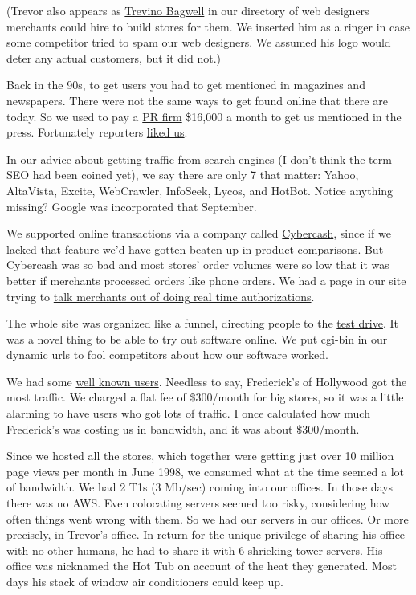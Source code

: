 \documentclass[12pt]{book}
\begin{document}
(Trevor also appears as
\href{http://ycombinator.com/viaweb/tlbwebdesign.html}{Trevino Bagwell}
in our directory of web designers merchants could hire to build stores
for them. We inserted him as a ringer in case some competitor tried to
spam our web designers. We assumed his logo would deter any actual
customers, but it did not.)

Back in the 90s, to get users you had to get mentioned in magazines and
newspapers. There were not the same ways to get found online that there
are today. So we used to pay a \href{submarine.html}{PR firm} \$16,000 a
month to get us mentioned in the press. Fortunately reporters
\href{http://ycombinator.com/viaweb/presquot.html}{liked us}.

In our \href{http://ycombinator.com/viaweb/se.html}{advice about getting
traffic from search engines} (I don't think the term SEO had been coined
yet), we say there are only 7 that matter: Yahoo, AltaVista, Excite,
WebCrawler, InfoSeek, Lycos, and HotBot. Notice anything missing? Google
was incorporated that September.

We supported online transactions via a company called
\href{http://en.wikipedia.org/wiki/CyberCash,_Inc.}{Cybercash}, since if
we lacked that feature we'd have gotten beaten up in product
comparisons. But Cybercash was so bad and most stores' order volumes
were so low that it was better if merchants processed orders like phone
orders. We had a page in our site trying to
\href{http://www.ycombinator.com/viaweb/cybercash.html}{talk merchants
out of doing real time authorizations}.

The whole site was organized like a funnel, directing people to the
\href{http://ycombinator.com/viaweb/tesdriv.html}{test drive}. It was a
novel thing to be able to try out software online. We put cgi-bin in our
dynamic urls to fool competitors about how our software worked.

We had some \href{http://ycombinator.com/viaweb/us.html}{well known
users}. Needless to say, Frederick's of Hollywood got the most traffic.
We charged a flat fee of \$300/month for big stores, so it was a little
alarming to have users who got lots of traffic. I once calculated how
much Frederick's was costing us in bandwidth, and it was about
\$300/month.

Since we hosted all the stores, which together were getting just over 10
million page views per month in June 1998, we consumed what at the time
seemed a lot of bandwidth. We had 2 T1s (3 Mb/sec) coming into our
offices. In those days there was no AWS. Even colocating servers seemed
too risky, considering how often things went wrong with them. So we had
our servers in our offices. Or more precisely, in Trevor's office. In
return for the unique privilege of sharing his office with no other
humans, he had to share it with 6 shrieking tower servers. His office
was nicknamed the Hot Tub on account of the heat they generated. Most
days his stack of window air conditioners could keep up.
\end{document}

